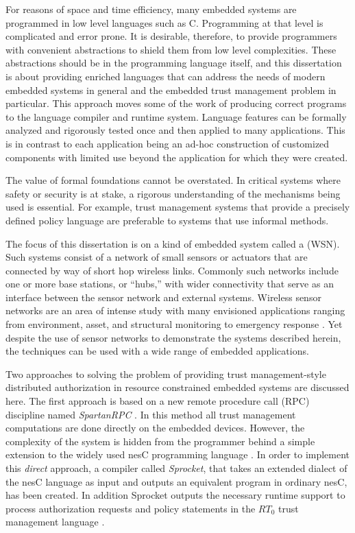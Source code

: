 For reasons of space and time efficiency, many embedded systems are programmed in low level
languages such as C. Programming at that level is complicated and error prone. It is desirable,
therefore, to provide programmers with convenient abstractions to shield them from low level
complexities. These abstractions should be in the programming language itself, and this
dissertation is about providing enriched languages that can address the needs of modern embedded
systems in general and the embedded trust management problem in particular. This
 approach moves some of the work of producing correct programs to the
language compiler and runtime system. Language features can be formally analyzed and rigorously
tested once and then applied to many applications. This is in contrast to each application being
an ad-hoc construction of customized components with limited use beyond the application for
which they were created.

The value of formal foundations cannot be overstated. In critical systems where safety or
security is at stake, a rigorous understanding of the mechanisms being used is essential. For
example, trust management systems that provide a precisely defined policy language are
preferable to systems that use informal methods.

The focus of this dissertation is on a kind of embedded system called a  (WSN). Such systems consist of a network of small sensors or actuators that are
connected by way of short hop wireless links. Commonly such networks include one or more base
stations, or ``hubs,'' with wider connectivity that serve as an interface between the sensor
network and external systems. Wireless sensor networks are an area of intense study with many
envisioned applications ranging from environment, asset, and structural monitoring to emergency
response \cite{Culler:2004:GEI:1018015.1018072,1038146}. Yet despite the use of sensor networks
to demonstrate the systems described herein, the techniques can be used with a wide range of
embedded applications.

Two approaches to solving the problem of providing trust management-style distributed
authorization in resource constrained embedded systems are discussed here. The first approach is
based on a new remote procedure call (RPC) discipline named \textit{SpartanRPC}
\cite{chapin-skalka-SpartanRPC,chapin-skalka-SpartanRPCTR}. In this method all trust management
computations are done directly on the embedded devices. However, the complexity of the system is
hidden from the programmer behind a simple extension to the widely used nesC programming
language \cite{Gay-nesC-2003}. In order to implement this \emph{direct} approach, a compiler
called \textit{Sprocket}, that takes an extended dialect of the nesC language as input and
outputs an equivalent program in ordinary nesC, has been created. In addition Sprocket outputs
the necessary runtime support to process authorization requests and policy statements in the
$RT_0$ trust management language \cite{Li:DRBTMF,Li:RRBTMF}.

